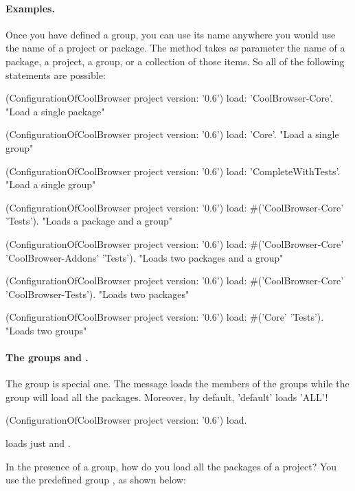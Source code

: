 \documentclass[a4paper,10pt,twoside]{book}
\begin{document}
\paragraph{Examples.} Once you have defined a group, you can use its name anywhere you would use the name of a project or package. The   method takes as parameter the name of a package, a project, a group, or a collection of those items.  So all of the following statements are possible:

 
\begin{code}{}
(ConfigurationOfCoolBrowser project version: '0.6') load: 'CoolBrowser-Core'. 
       "Load a single package"

(ConfigurationOfCoolBrowser project version: '0.6') load: 'Core'. 
       "Load a single group"

(ConfigurationOfCoolBrowser project version: '0.6') load: 'CompleteWithTests'.  
       "Load a single group"
 
(ConfigurationOfCoolBrowser project version: '0.6') 
       load: #('CoolBrowser-Core' 'Tests').    
       "Loads a package and a group"

(ConfigurationOfCoolBrowser project version: '0.6') 
       load: #('CoolBrowser-Core' 'CoolBrowser-Addons' 'Tests'). 
       "Loads two packages and a group" 

(ConfigurationOfCoolBrowser project version: '0.6') 
       load: #('CoolBrowser-Core' 'CoolBrowser-Tests').
       "Loads two packages"
  
(ConfigurationOfCoolBrowser project version: '0.6') load: #('Core' 'Tests'). 
       "Loads two groups"
\end{code}


\paragraph{The groups  and .} 
The  group is special one.  The  message loads the members of the  groups while the group  
will load all the packages. Moreover, by default, 'default' loads 'ALL'!

    
\begin{code}{}
(ConfigurationOfCoolBrowser project version: '0.6') load.
\end{code}

\noindent
loads just  and .

In the presence of a  group, how do you load all the packages of a project?  You use the predefined group  , as shown below: 
\end{document}
